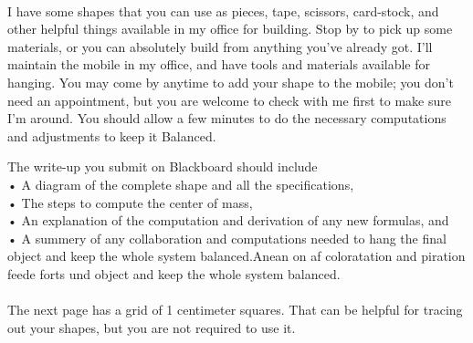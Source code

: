 \documentclass[5pt,a4paper]{article}
\begin{document}
\paragraph{}
\bigskip I have some shapes that you can use as pieces, tape, scissors, card-stock, and other helpful things available in my office for building. Stop by to pick up some materials, or you can absolutely build from anything you've already got. I'll maintain the mobile in my office, and have tools and materials available for hanging. You may come by anytime to add your shape to the mobile; you don't need an appointment, but you are welcome to check with me first to make sure I'm around. You should allow a few minutes to do the necessary computations and adjustments to keep it Balanced. \\
\begin{enumerate}
The write-up you submit on Blackboard should include \\
• A diagram of the complete shape and all the specifications,\\ 
• The steps to compute the center of mass,\\
• An explanation of the computation and derivation of any new formulas, and \\
 • A summery of any collaboration and computations needed to hang the final object and keep the whole system balanced.Anean on af coloratation and piration feede forts und object and keep the whole system balanced.
\end{enumerate} 
\paragraph{}

\bigskip The next page has a grid of 1 centimeter squares. That can be helpful for tracing out your shapes, but you are not required to use it.
\end{document}
